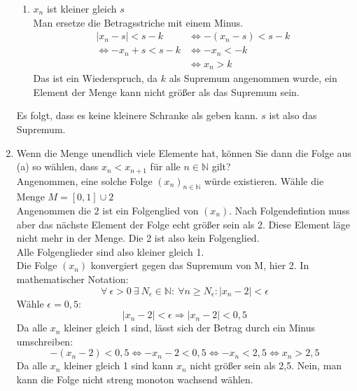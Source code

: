 \documentclass{article}
\begin{document}
\begin{enumerate}[ label= (\alph*) ]
\begin{enumerate}[ label = \arabic*. Fall ]
            \item \(x_n\) ist kleiner gleich \(s\) \\
            Man ersetze  die Betragsstriche mit einem Minus.
            \begin{align*}
                |x_n - s| < s - k &\Leftrightarrow -(x_n - s) < s - k \\
                  \Leftrightarrow -x_n + s < s - k &\Leftrightarrow - x_n < - k \\
                  &\Leftrightarrow x_n > k
            \end{align*}
            Das ist ein Wiederspruch, da \(k\) als Supremum angenommen wurde, ein Element der Menge kann nicht größer als das Supremum sein.
        \end{enumerate}
        Es folgt, dass es keine kleinere Schranke als geben kann. \(s\) ist also das Supremum.

        \item Wenn die Menge unendlich viele Elemente hat, können Sie dann die Folge aus (a) so wählen, dass \( x_n < x_{n+1} \) für alle \( n \in \mathbb{N} \) gilt? \\
        Angenommen, eine solche Folge \( { (x_n) }_{ n \in \mathbb{N} } \) würde existieren. Wähle die Menge \(M = [0,1] \cup {2} \) \\
        Angenommen die 2 ist ein Folgenglied von \((x_n)\). Nach Folgendefintion muss aber das nächste Element der Folge
        echt größer sein als 2. Diese Element läge nicht mehr in der Menge. Die 2 ist also kein Folgenglied. \\
        Alle Folgenglieder sind also kleiner gleich 1. \\
        Die Folge \((x_n)\) konvergiert gegen das Supremum von M, hier 2. In mathematischer Notation:
        \[\forall \: \epsilon > 0 \: \exists \: N_{\epsilon} \in \mathbb{N}: \: \forall n \geq N_{\epsilon}: |x_n - 2| < \epsilon \]
        Wähle \( \epsilon = 0,5 \):
        \[ |x_n - 2| < \epsilon \Rightarrow |x_n - 2| < 0,5\]
        Da alle \(x_n\) kleiner gleich 1 sind, lässt sich der Betrag durch ein Minus umschreiben:
        \[ -(x_n - 2) < 0,5 \Leftrightarrow -x_n -2 < 0,5 \Leftrightarrow -x_n < 2,5 \Leftrightarrow x_n > 2,5 \]
        Da alle \(x_n\) kleiner gleich 1 sind kann \(x_n\) nicht größer sein als 2,5.
        Nein, man kann die Folge nicht streng monoton wachsend wählen.
    \end{enumerate}
    
\end{document}
